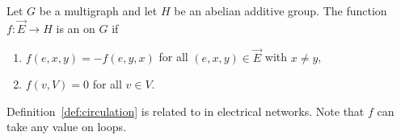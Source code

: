 \begin{definition}[\(H\)-circulation] \label{def:circulation}
	Let \(G\) be a multigraph and let \(H\) be an abelian additive group.
	The function \(f \colon \vec{E} \to H\) is an  on \(G\) if
	\begin{enumerate}
		\item \(f(e, x, y) = -f(e, y, x)\) for all \((e, x, y) \in \vec{E}\) with \(x \neq y\),
		      \label{item:circulation_antisymmetry}
		\item \(f(v, V) = 0\) for all \(v \in V\).
		      \label{item:circulation_balance}
	\end{enumerate}
\end{definition}
Definition~\ref{def:circulation} is related to  in electrical networks.
Note that \(f\) can take any value on loops.

